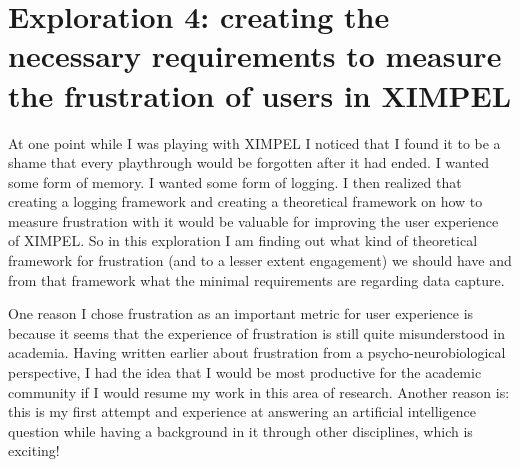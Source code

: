 
\chapter{Exploration 4: creating the necessary requirements to measure the frustration of users in XIMPEL}

At one point while I was playing with XIMPEL I noticed that I found it to be a shame that every playthrough would be forgotten after it had ended. I wanted some form of memory. I wanted some form of logging. I then realized that creating a logging framework and creating a theoretical framework on how to measure frustration with it would be valuable for improving the user experience of XIMPEL. So in this exploration I am finding out what kind of theoretical framework for frustration (and to a lesser extent engagement) we should have and from that framework what the minimal requirements are regarding data capture.

One reason I chose frustration as an important metric for user experience is because it seems that the experience of frustration is still quite misunderstood in academia. Having written earlier about frustration from a psycho-neurobiological perspective, I had the idea that I would be most productive for the academic community if I would resume my work in this area of research. Another reason is: this is my first attempt and experience at answering an artificial intelligence question while having a background in it through other disciplines, which is exciting!



